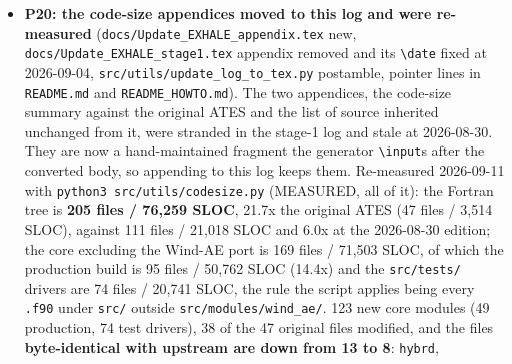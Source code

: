 \documentclass[english,a4paper]{my_memo}
\begin{document}
\begin{itemize}
  and after with no row lost (two renamed:
  \texttt{the\_fixed\_tolerance\_alone\_reports\_the\_base\_cell},
  \texttt{and\_the\_fixed\_reading\_is\_never\_below\_the\_distance}), \texttt{steady\_species\_rows}
  195/0, \texttt{certification} 70/0, \texttt{steady\_completion\_flag} 3/0; a compile RED
  (the entry-text drivers against the delivered objects fail on the missing
  symbol), a semantic RED of the cell-by-cell fact (327/7, P17\textquotesingle s seven rows)
  and a semantic RED of the restatement itself (329/5, the fixture\textquotesingle s floor
  raised into the anchored regime) all discriminate. Impact: the
  \texttt{wasp\_full\_newton} reload gives \texttt{info\ =\ 0}, CERTIFIED, \texttt{\textbar{}\textbar{}R\textbar{}\textbar{}} 1.495e-9,
  \texttt{log10\ Mdot} 13.30 in both arms, all eleven output files byte-identical, the
  two run logs differing in the execution-time line alone. Documents that
  named the deleted function as current fact
  (\texttt{certification\_tolerance\_anchoring\_20260910.md},
  \texttt{session\_handoff\_20260911.md}) were corrected by the advisor.
\item
  \textbf{P20: the code-size appendices moved to this log and were re-measured}
  (\texttt{docs/Update\_EXHALE\_appendix.tex} new, \texttt{docs/Update\_EXHALE\_stage1.tex}
  appendix removed and its \texttt{\textbackslash{}date} fixed at 2026-09-04,
  \texttt{src/utils/update\_log\_to\_tex.py} postamble, pointer lines in \texttt{README.md} and
  \texttt{README\_HOWTO.md}). The two appendices, the code-size summary against the
  original ATES and the list of source inherited unchanged from it, were
  stranded in the stage-1 log and stale at 2026-08-30. They are now a
  hand-maintained fragment the generator \texttt{\textbackslash{}input}s after the converted body,
  so appending to this log keeps them. Re-measured 2026-09-11 with
  \texttt{python3\ src/utils/codesize.py} (MEASURED, all of it): the Fortran tree is
  \textbf{205 files / 76,259 SLOC}, 21.7x the original ATES (47 files / 3,514
  SLOC), against 111 files / 21,018 SLOC and 6.0x at the 2026-08-30 edition;
  the core excluding the Wind-AE port is 169 files / 71,503 SLOC, of which the
  production build is 95 files / 50,762 SLOC (14.4x) and the \texttt{src/tests/}
  drivers are 74 files / 20,741 SLOC, the rule the script applies being every
  \texttt{.f90} under \texttt{src/} outside \texttt{src/modules/wind\_ae/}. 123 new core modules
  (49 production, 74 test drivers), 38 of the 47 original files modified, and
  the files \textbf{byte-identical with upstream are down from 13 to 8}: \texttt{hybrd},

\end{itemize}
\end{document}
